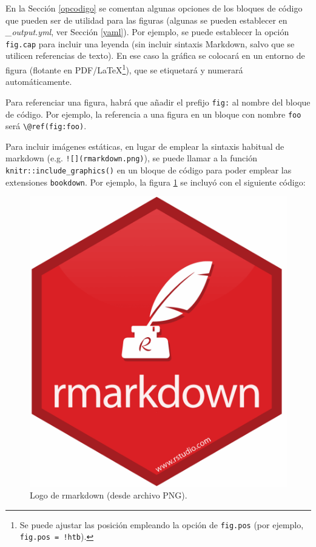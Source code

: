 \documentclass[]{book}
\newenvironment{Shaded}{\begin{snugshade}}{\end{snugshade}}
\newcommand{\NormalTok}[1]{#1}
\let\rmarkdownfootnote\footnote%
\def\footnote{\protect\rmarkdownfootnote}
\theoremstyle{definition}
\theoremstyle{definition}
\theoremstyle{definition}
\theoremstyle{remark}
\begin{document}
En la Sección \ref{opcodigo} se comentan algunas opciones de los bloques
de código que pueden ser de utilidad para las figuras (algunas se pueden
establecer en \emph{\_output.yml}, ver Sección \ref{yaml}). Por ejemplo,
se puede establecer la opción \texttt{fig.cap} para incluir una leyenda
(sin incluir sintaxis Markdown, salvo que se utilicen referencias de
texto). En ese caso la gráfica se colocará en un entorno de figura
(flotante en PDF/LaTeX\footnote{Se puede ajustar las posición empleando
  la opción de \texttt{fig.pos} (por ejemplo,
  \texttt{fig.pos\ =\ \textquotesingle{}!htb\textquotesingle{}}).}), que
se etiquetará y numerará automáticamente.

Para referenciar una figura, habrá que añadir el prefijo \texttt{fig:}
al nombre del bloque de código. Por ejemplo, la referencia a una figura
en un bloque con nombre \texttt{foo} será
\texttt{\textbackslash{}@ref(fig:foo)}.

Para incluir imágenes estáticas, en lugar de emplear la sintaxis
habitual de markdown (e.g. \texttt{!{[}{]}(rmarkdown.png)}), se puede
llamar a la función \texttt{knitr::include\_graphics()} en un bloque de
código para poder emplear las extensiones \texttt{bookdown}. Por
ejemplo, la figura \ref{fig:rmarkdown} se incluyó con el siguiente
código:

\begin{Shaded}
\end{Shaded}

\begin{figure}

{\centering \includegraphics[width=0.3\linewidth]{images/rmarkdown} 

}

\caption{Logo de rmarkdown (desde archivo PNG).}\label{fig:rmarkdown}
\end{figure}
\end{document}
